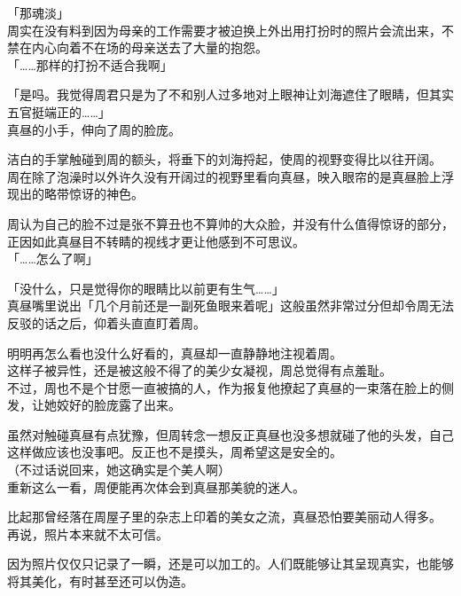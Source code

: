 「那魂淡」\\

周实在没有料到因为母亲的工作需要才被迫换上外出用打扮时的照片会流出来，不禁在内心向着不在场的母亲送去了大量的抱怨。\\

「……那样的打扮不适合我啊」

「是吗。我觉得周君只是为了不和别人过多地对上眼神让刘海遮住了眼睛，但其实五官挺端正的……」\\

真昼的小手，伸向了周的脸庞。

洁白的手掌触碰到周的额头，将垂下的刘海捋起，使周的视野变得比以往开阔。\\

周在除了泡澡时以外许久没有开阔过的视野里看向真昼，映入眼帘的是真昼脸上浮现出的略带惊讶的神色。

周认为自己的脸不过是张不算丑也不算帅的大众脸，并没有什么值得惊讶的部分，正因如此真昼目不转睛的视线才更让他感到不可思议。\\

「……怎么了啊」

「没什么，只是觉得你的眼睛比以前更有生气……」\\

真昼嘴里说出「几个月前还是一副死鱼眼来着呢」这般虽然非常过分但却令周无法反驳的话之后，仰着头直直盯着周。

明明再怎么看也没什么好看的，真昼却一直静静地注视着周。\\

这样子被异性，还是被这般不得了的美少女凝视，周总觉得有点羞耻。\\

不过，周也不是个甘愿一直被搞的人，作为报复他撩起了真昼的一束落在脸上的侧发，让她姣好的脸庞露了出来。

虽然对触碰真昼有点犹豫，但周转念一想反正真昼也没多想就碰了他的头发，自己这样做应该也没事吧。反正也不是摸头，周希望这是安全的。\\

（不过话说回来，她这确实是个美人啊）\\

重新这么一看，周便能再次体会到真昼那美貌的迷人。

比起那曾经落在周屋子里的杂志上印着的美女之流，真昼恐怕要美丽动人得多。\\

再说，照片本来就不太可信。

因为照片仅仅只记录了一瞬，还是可以加工的。人们既能够让其呈现真实，也能够将其美化，有时甚至还可以伪造。\\

